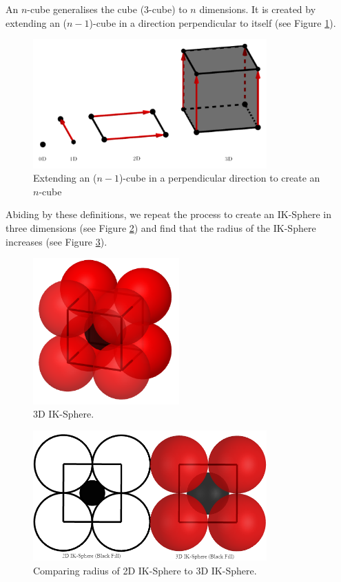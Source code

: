 \begin{definition}[$n$-Cube]\label{def:n-cube}
    An $n$-cube generalises the cube (3-cube) to $n$ dimensions. It is created by extending an ($n-1$)-cube in a direction perpendicular to itself (see Figure \ref{fig:how to n cube}).
    \begin{figure}[h]
    \centering
    \includegraphics[width=0.8\textwidth]{images/how to make n sphere.png}
    \caption{\label{fig:how to n cube}Extending an ($n-1$)-cube in a perpendicular direction to create an $n$-cube}
    \end{figure}
\end{definition}
Abiding by these definitions, we repeat the process to create an IK-Sphere in three dimensions (see Figure \ref{fig:3d_IK_Sphere}) and find that the radius of the IK-Sphere increases (see Figure \ref{fig:compare IK spheres}). 

\begin{figure}[h]
    \centering
    \includegraphics[width=0.5\textwidth]{images/3D IK.png}
    \caption{\label{fig:3d_IK_Sphere}3D IK-Sphere.}
\end{figure}

\begin{figure}[h]
    \centering
    \includegraphics[width=0.8\textwidth]{images/compare ik spheres.png}
    \caption{\label{fig:compare IK spheres}Comparing radius of 2D IK-Sphere to 3D IK-Sphere.}
\end{figure}

